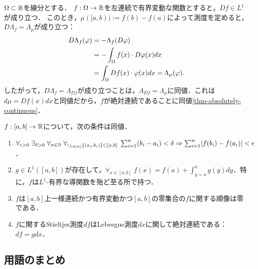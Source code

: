 \documentclass[uplatex,dvipdfmx]{jsreport}
\begin{document}
\begin{example}
    $\Omega\subset\mathbb{R}$を線分とする．
    $f:\Omega\to\mathbb{R}$を左連続で有界変動な関数とすると，$Df\in L^1$が成り立つ．
    このとき，$\mu([a,b)):=f(b)-f(a)$によって測度を定めると，$D\Lambda_f=\Lambda_\mu$が成り立つ：
    \begin{align*}
        D\Lambda_f(\varphi)&=-\Lambda_f(D\varphi)\\
        &=-\int_\Omega f(x)\cdot D\varphi(x)dx\\
        &=\int_\Omega Df(x)\cdot\varphi(x)dx=\Lambda_\mu(\varphi).
    \end{align*}
    したがって，$D\Lambda_f=\Lambda_{Df}$が成り立つことは，$\Lambda_{Df}=\Lambda_\mu$に同値．これは$d\mu=Df(x)dx$と同値だから，$f$が絶対連続であることに同値\ref{thm-absolutely-continuous}．
\end{example}

\begin{theorem}[絶対連続性の復習]\label{thm-absolutely-continuous}
    $f:[a,b]\to\mathbb{R}$について，次の条件は同値．
    \begin{enumerate}
        \item $\forall_{\epsilon>0}\;\exists_{\delta>0}\;\forall_{n\in\mathbb{N}}\;\forall_{\sqcup_{i\in[n]}\{(a_i,b_i)\}\subset[a,b]}\;\sum^n_{i=1}(b_i-a_i)<\delta\Rightarrow\sum^n_{i=1}\lvert f(b_i)-f(a_i)\rvert<\epsilon$．
        \item $g\in L^1([a,b])$が存在して，$\forall_{x\in[a,b]}\;f(x)=f(a)+\int_{y=a}^xg(y)dy$．特に，$f$は$L^1$-有界な導関数を殆ど至る所で持つ．
        \item $f$は$[a,b]$上一様連続かつ有界変動かつ$[a,b]$の零集合の$f$に関する順像は零である．
        \item $f$に関するStieltjes測度$df$はLebesgue測度$dx$に関して絶対連続である：$df=gdx$．
    \end{enumerate}
\end{theorem}

\subsection{用語のまとめ}
\end{document}
